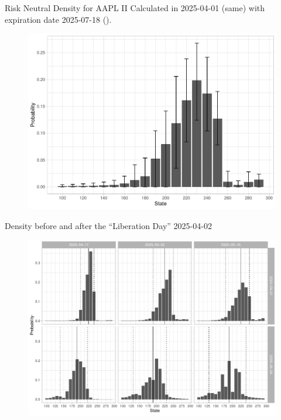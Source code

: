 \documentclass[10pt,aspectratio=43]{beamer}
\begin{document}
\begin{frame}{Risk Neutral Density for AAPL II}
    Calculated in 2025-04-01 (same) with expiration date 2025-07-18 ().
    \begin{figure}\centering
        \begin{minipage}{0.75\linewidth}
        \includegraphics[width=\linewidth]{betas_01_3.pdf}
     \end{minipage}
    \end{figure}
\end{frame}



\begin{frame}{Density before and after the ``Liberation Day'' 2025-04-02}
    \begin{figure} \centering
        \begin{minipage}{0.85\linewidth}
                \includegraphics[width=\linewidth]{betas.pdf}
        \end{minipage}
    \end{figure}
\end{frame}
 
\end{document}
